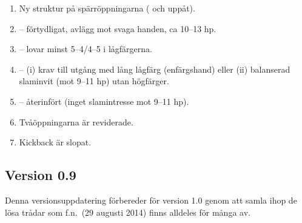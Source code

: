 \begin{enumerate}

\item Ny struktur på spärröppningarna ( och uppåt).

\item {}-- förtydligat, avlägg mot svaga handen, ca 10--13 hp.

\item {}-- lovar minst 5--4/4--5 i lågfärgerna.

\item {}-- (i) krav till utgång med lång lågfärg (enfärgshand)
  eller (ii) balanserad slaminvit (mot 9--11 hp) utan högfärger.

\item {}-- återinfört (inget slamintresse mot 9--11 hp).

\item Tvåöppningarna är reviderade.

\item Kickback är slopat.
\end{enumerate}

\subsection*{Version 0.9}

Denna versionsuppdatering förbereder för version 1.0 genom att samla ihop
de lösa trådar som f.n.\ (29 augusti 2014) finns alldeles för många av.
